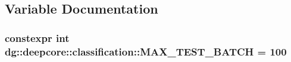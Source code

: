 \subsection{Variable Documentation}
\subsubsection[{\texorpdfstring{M\+A\+X\+\_\+\+T\+E\+S\+T\+\_\+\+B\+A\+T\+CH}{MAX_TEST_BATCH}}]{\setlength{\rightskip}{0pt plus 5cm}constexpr int dg\+::deepcore\+::classification\+::\+M\+A\+X\+\_\+\+T\+E\+S\+T\+\_\+\+B\+A\+T\+CH = 100}\hypertarget{namespacedg_1_1deepcore_1_1classification_aa446ed99e9dde48dda8f883367797b68}{}\label{namespacedg_1_1deepcore_1_1classification_aa446ed99e9dde48dda8f883367797b68}
